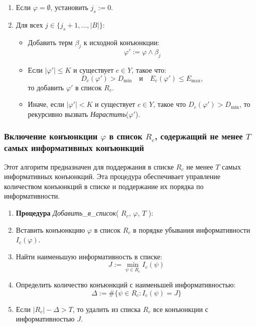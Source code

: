 \begin{enumerate}
    \item Если \(\varphi = \emptyset\), установить \(j_s := 0\).
    \item Для всех \(j \in \{ j_s + 1, \dots, |B| \}\):
    \begin{itemize}
        \item Добавить терм \(\beta_j\) к исходной конъюнкции:
        \[
        \varphi' := \varphi \wedge \beta_j
        \]
        \item Если \(|\varphi'| \leq K\) и существует \(c \in Y\), такое что:
        \[
        D_c(\varphi') > D_{\text{min}} \quad \text{и} \quad E_c(\varphi') \leq E_{\text{max}},
        \]
        то добавить \(\varphi'\) в список \(R_c\).
        \item Иначе, если \(|\varphi'| < K\) и существует \(c \in Y\), такое что \(D_c(\varphi') > D_{\text{min}}\), то рекурсивно вызвать \textit{Нарастить}(\(\varphi'\)).
    \end{itemize}
\end{enumerate}

\subsubsection{Включение конъюнкции \(\varphi\) в список \(R_c\), содержащий не менее \(T\) самых информативных конъюнкций}

Этот алгоритм предназначен для поддержания в списке \(R_c\) не менее \(T\) самых информативных конъюнкций. Эта процедура обеспечивает управление количеством конъюнкций в списке и поддержание их порядка по информативности.

\begin{enumerate}
    \item \textbf{Процедура} \textit{Добавить\_в\_список}( \(R_c\), \(\varphi\), \(T\) ):
    \item Вставить конъюнкцию \(\varphi\) в список \(R_c\) в порядке убывания информативности \(I_c(\varphi)\).
    \item Найти наименьшую информативность в списке:
    \[
    J := \min_{\psi \in R_c} I_c(\psi)
    \]
    \item Определить количество конъюнкций с наименьшей информативностью:
    \[
    \Delta := \#\{ \psi \in R_c : I_c(\psi) = J \}
    \]
    \item Если \(|R_c| - \Delta > T\), то удалить из списка \(R_c\) все конъюнкции с информативностью \(J\).
\end{enumerate}

